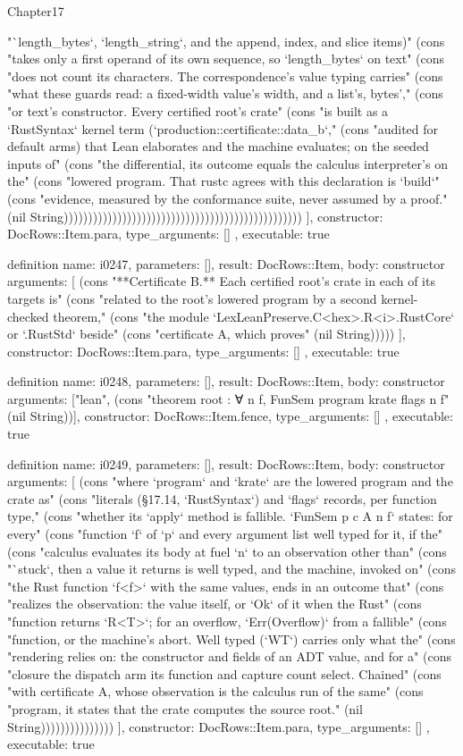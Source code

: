 \begin{lexlean}{Chapter17}
\begin{semanticmodule}
{{"`length_bytes`, `length_string`, and the append, index, and slice items)" (cons "takes only a first operand of its own sequence, so `length_bytes` on text" (cons "does not count its characters. The correspondence's value typing carries" (cons "what these guards read: a fixed-width value's width, and a list's, bytes'," (cons "or text's constructor. Every certified root's crate" (cons "is built as a `RustSyntax` kernel term (`production::certificate::data_b`," (cons "audited for default arms) that Lean elaborates and the machine evaluates; on the seeded inputs of" (cons "the differential, its outcome equals the calculus interpreter's on the" (cons "lowered program. That rustc agrees with this declaration is `build`" (cons "evidence, measured by the conformance suite, never assumed by a proof." (nil String)))))))))))))))))))))))))))))))))))))))))))))))))
    ],
    constructor: DocRows::Item.para,
    type_arguments: []
  },
  executable: true
}

definition{
  name: i0247,
  parameters: [],
  result: DocRows::Item,
  body: constructor{
    arguments: [
      (cons "**Certificate B.** Each certified root's crate in each of its targets is" (cons "related to the root's lowered program by a second kernel-checked theorem," (cons "the module `LexLeanPreserve.C<hex>.R<i>.RustCore` or `.RustStd` beside" (cons "certificate A, which proves" (nil String)))))
    ],
    constructor: DocRows::Item.para,
    type_arguments: []
  },
  executable: true
}

definition{
  name: i0248,
  parameters: [],
  result: DocRows::Item,
  body: constructor{
    arguments: ["lean", (cons "theorem root : ∀ n f, FunSem program krate flags n f" (nil String))],
    constructor: DocRows::Item.fence,
    type_arguments: []
  },
  executable: true
}

definition{
  name: i0249,
  parameters: [],
  result: DocRows::Item,
  body: constructor{
    arguments: [
      (cons "where `program` and `krate` are the lowered program and the crate as" (cons "literals (§17.14, `RustSyntax`) and `flags` records, per function type," (cons "whether its `apply` method is fallible. `FunSem p c A n f` states: for every" (cons "function `f` of `p` and every argument list well typed for it, if the" (cons "calculus evaluates its body at fuel `n` to an observation other than" (cons "`stuck`, then a value it returns is well typed, and the machine, invoked on" (cons "the Rust function `f<f>` with the same values, ends in an outcome that" (cons "realizes the observation: the value itself, or `Ok` of it when the Rust" (cons "function returns `R<T>`; for an overflow, `Err(Overflow)` from a fallible" (cons "function, or the machine's abort. Well typed (`WT`) carries only what the" (cons "rendering relies on: the constructor and fields of an ADT value, and for a" (cons "closure the dispatch arm its function and capture count select. Chained" (cons "with certificate A, whose observation is the calculus run of the same" (cons "program, it states that the crate computes the source root." (nil String)))))))))))))))
    ],
    constructor: DocRows::Item.para,
    type_arguments: []
  },
  executable: true
}


\end{semanticmodule}
\end{lexlean}
